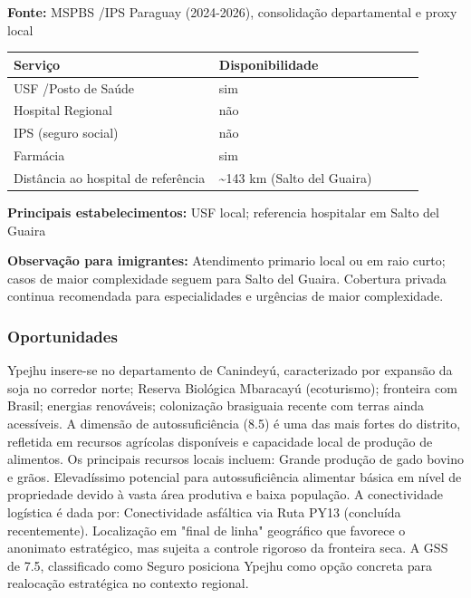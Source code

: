 \textbf{Fonte:} MSPBS /\allowbreak  IPS Paraguay (2024-2026), consolidação
departamental e proxy local

{\def\LTcaptype{none} %
\begin{longtable}{@{}>{\raggedright\arraybackslash}p{0.45\linewidth} >{\raggedright\arraybackslash}p{0.45\linewidth}@{}}
\toprule\noalign{}
Serviço & Disponibilidade \\
\midrule\noalign{}
\endhead
\bottomrule\noalign{}
\endlastfoot
USF /\allowbreak  Posto de Saúde & sim \\
Hospital Regional & não \\
IPS (seguro social) & não \\
Farmácia & sim \\
Distância ao hospital de referência & \textasciitilde143 km (Salto del
Guaira) \\
\end{longtable}
}

\textbf{Principais estabelecimentos:} USF local; referencia hospitalar
em Salto del Guaira

\textbf{Observação para imigrantes:} Atendimento primario local ou em
raio curto; casos de maior complexidade seguem para Salto del Guaira.
Cobertura privada continua recomendada para especialidades e urgências
de maior complexidade.

\subsubsection*{Oportunidades}\label{oport-ypejhu-1406}
Ypejhu insere-se no departamento de Canindeyú, caracterizado por expansão da soja no corredor norte; Reserva Biológica Mbaracayú (ecoturismo); fronteira com Brasil; energias renováveis; colonização brasiguaia recente com terras ainda acessíveis. A dimensão de autossuficiência (8.5) é uma das mais fortes do distrito, refletida em recursos agrícolas disponíveis e capacidade local de produção de alimentos. Os principais recursos locais incluem: Grande produção de gado bovino e grãos. Elevadíssimo potencial para autossuficiência alimentar básica em nível de propriedade devido à vasta área produtiva e baixa população. A conectividade logística é dada por: Conectividade asfáltica via Ruta PY13 (concluída recentemente). Localização em "final de linha" geográfico que favorece o anonimato estratégico, mas sujeita a controle rigoroso da fronteira seca. A GSS de 7.5, classificado como Seguro posiciona Ypejhu como opção concreta para realocação estratégica no contexto regional.

